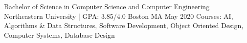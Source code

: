 

\begin{cventries}

  \cventry
    {Bachelor of Science in Computer Science and Computer Engineering} %
    {Northeastern University | GPA: 3.85/4.0} %
    {Boston MA} %
    {May 2020} %
    {
      Courses: AI, Algorithms \& Data Structures, Software Development, Object Oriented Design, Computer Systems, Database Design
    }

\end{cventries}
